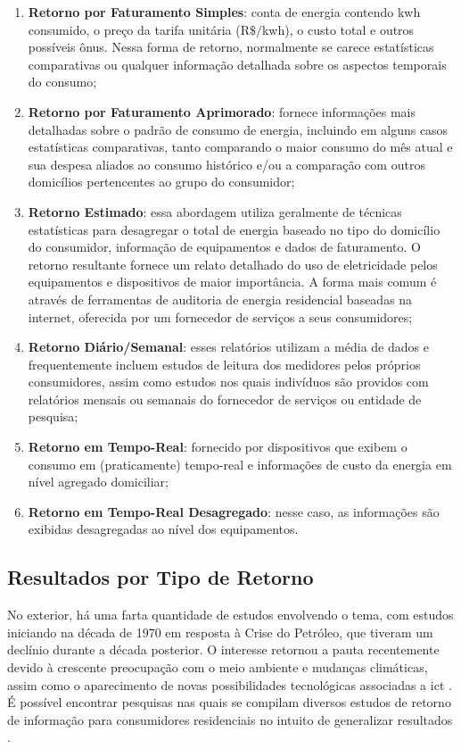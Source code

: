 \begin{enumerate}
\item \textbf{Retorno por Faturamento Simples}: conta de energia contendo 
k\acs{wh} 
consumido, o preço da tarifa unitária ($\text{R\$}/$k\acs{wh}), o custo 
total e outros possíveis ônus. Nessa forma de retorno, normalmente se carece 
estatísticas comparativas ou qualquer informação detalhada sobre os aspectos 
temporais do consumo;
\item \textbf{Retorno por Faturamento Aprimorado}: fornece informações mais 
detalhadas
sobre o padrão de consumo de energia, incluindo em alguns casos estatísticas
comparativas, tanto comparando o maior consumo do mês atual e sua despesa
aliados ao consumo histórico e/ou a comparação com outros domicílios
pertencentes ao grupo do consumidor;
\item \textbf{Retorno Estimado}: essa abordagem utiliza geralmente de técnicas
estatísticas para desagregar o total de energia baseado no tipo do
domicílio do consumidor, informação de equipamentos e dados de faturamento. O
retorno resultante fornece um relato detalhado do uso de eletricidade pelos
equipamentos e dispositivos de maior importância. A forma mais comum é através de
ferramentas de auditoria de energia residencial baseadas na internet, oferecida
por um fornecedor de serviços a seus consumidores;
\item \textbf{Retorno Diário/Semanal}: esses relatórios utilizam a média de
dados e frequentemente incluem estudos de leitura dos medidores pelos próprios 
consumidores, assim como estudos nos quais indivíduos são providos com
relatórios mensais ou semanais do fornecedor de serviços ou entidade de
pesquisa;
\item \textbf{Retorno em Tempo-Real}: fornecido por dispositivos que exibem o
consumo em (praticamente) tempo-real e informações de custo da energia em nível
agregado domiciliar;
\item \textbf{Retorno em Tempo-Real Desagregado}: nesse caso, as informações são
exibidas desagregadas ao nível dos equipamentos.
\end{enumerate}

\subsection{Resultados por Tipo de Retorno}
\label{ssec:ret_eff}

No exterior, há uma farta quantidade de estudos envolvendo o tema, com estudos iniciando na
década de 1970 em resposta à Crise do Petróleo, que tiveram um declínio durante
a década posterior. O interesse retornou a pauta recentemente devido à crescente 
preocupação com o meio ambiente e mudanças climáticas, assim 
como o aparecimento de novas possibilidades tecnológicas 
associadas a \gls{ict} \cite{aceee_2010_estudos_feedback}. É
possível encontrar pesquisas nas quais se compilam diversos estudos
de retorno de informação para consumidores residenciais no intuito de generalizar 
resultados \cite{aceee_2010_estudos_feedback,2011_zhifeng_smart_energy_savings,
2006_darby,2009_nber_studies_us,ucla_studies_1975_2011_usa}.

